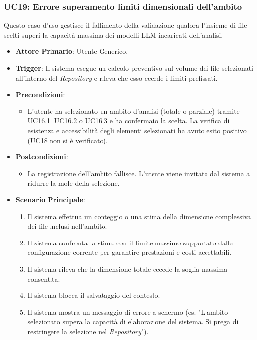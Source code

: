 \documentclass[12pt, a4paper]{article}
\begin{document}
\subsubsection{UC19: Errore superamento limiti dimensionali dell'ambito}\label{uc:19}
Questo caso d'uso gestisce il fallimento della validazione qualora l'insieme di file scelti superi la capacità massima dei modelli LLM incaricati dell'analisi.
\begin{itemize}
    \item \textbf{Attore Primario}: Utente Generico.
    \item \textbf{Trigger}: Il sistema esegue un calcolo preventivo sul volume dei file selezionati all'interno del \textit{Repository} e rileva che esso eccede i limiti prefissati.
    \item \textbf{Precondizioni}:\begin{itemize}\item L'utente ha selezionato un ambito d'analisi (totale o parziale) tramite UC16.1, UC16.2 o UC16.3 e ha confermato la scelta. La verifica di esistenza e accessibilità degli elementi selezionati ha avuto esito positivo (UC18 non si è verificato).\end{itemize}
    \item \textbf{Postcondizioni}:\begin{itemize}\item La registrazione dell'ambito fallisce. L'utente viene invitato dal sistema a ridurre la mole della selezione.\end{itemize}
    \item \textbf{Scenario Principale}:
    \begin{enumerate}
        \item Il sistema effettua un conteggio o una stima della dimensione complessiva dei file inclusi nell'ambito.
        \item Il sistema confronta la stima con il limite massimo supportato dalla configurazione corrente per garantire prestazioni e costi accettabili.
        \item Il sistema rileva che la dimensione totale eccede la soglia massima consentita.
        \item Il sistema blocca il salvataggio del contesto.
        \item Il sistema mostra un messaggio di errore a schermo (es. "L'ambito selezionato supera la capacità di elaborazione del sistema. Si prega di restringere la selezione nel \textit{Repository}").
    \end{enumerate}
\end{itemize}
\end{document}
